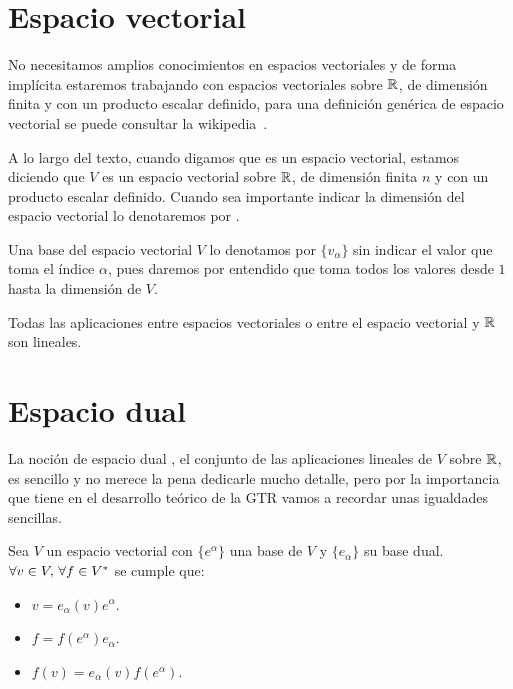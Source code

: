 \section{Espacio vectorial}\label{subsec:espacio-vectorial}
No necesitamos amplios conocimientos en espacios vectoriales y de forma implícita estaremos trabajando con espacios
vectoriales sobre $\mathbb{R}$, de dimensión finita y con un producto escalar definido, para una definición genérica de
espacio vectorial se puede consultar la wikipedia~\cite{wiki:espacio-vectorial}.

A lo largo del texto, cuando digamos que  es un espacio
vectorial, estamos diciendo que $V$ es un espacio vectorial sobre $\mathbb{R}$, de dimensión finita $n$ y con un producto
escalar definido.
Cuando sea importante indicar la dimensión del espacio vectorial lo denotaremos por
.

Una base del espacio vectorial $V$ lo denotamos por $\{v_\alpha\}$ sin indicar el valor que toma el índice $\alpha$,
pues daremos por entendido que toma todos los valores desde $1$ hasta la dimensión de $V$.

Todas las aplicaciones entre espacios vectoriales o entre el espacio vectorial y $\mathbb{R}$ son lineales.

\section{Espacio dual}\label{sec:espacio-dual}
La noción de espacio dual \cite{wiki:espacio-dual}, el conjunto de las aplicaciones lineales de $V$ sobre $\mathbb{R}$, es
sencillo y no merece la pena dedicarle mucho detalle, pero por la importancia que tiene en el desarrollo teórico de
la GTR vamos a recordar unas igualdades sencillas.

\begin{proposition}
  \label{res:coordenadas_duales}
  Sea $V$ un espacio vectorial con $\{e^\alpha\}$ una base de $V$ y $\{e_\alpha\}$ su base dual.
  $\forall v\in V,\thinspace \forall f\in V^*$ se cumple que:
  \begin{itemize}
    \item $v=e_\alpha(v)e^\alpha$.
    \item $f=f(e^\alpha)e_\alpha$.
    \item $f(v)=e_\alpha(v)f(e^\alpha)$.
  \end{itemize}
\end{proposition}

